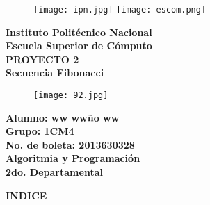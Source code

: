 \documentclass[letterpaper]{article}
\begin{document}
\pagestyle{empty}

\begin{figure}
	\texttt{[image: ipn.jpg]}
	\hspace{12.5cm}
	\texttt{[image: escom.png]}
\end{figure}

\begin{center}
\textbf{\LARGE Instituto Polit\'ecnico Nacional\\} %
\textbf{\Large Escuela Superior de C\'omputo\\}
\vspace{0.9cm}
\textbf{\LARGE PROYECTO 2\\}
\textbf{\Large Secuencia Fibonacci\\}
\vspace{0.5cm}
\end{center}

\begin{center}
\begin{figure}[H] %
	\hspace{3cm}\texttt{[image: 92.jpg]}
\end{figure}
\end{center}

\begin{center}
\textbf{\Large Alumno: ww ww\~no ww\\} %
\textbf{\Large Grupo: 1CM4\\}
\textbf{\Large No. de boleta: 2013630328\\}
\vspace{0.9cm}
\textbf{\LARGE Algoritmia y Programaci\'on\\}
\textbf{\Large 2do. Departamental\\}
\end{center}

\clearpage

\begin{center}
\textbf{\LARGE INDICE\\}
\vspace{1.5cm}
\end{center}
\end{document}
